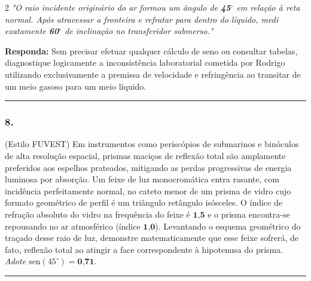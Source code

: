 \documentclass[twoside, 10pt, a4paper]{article}
\newlength{\espacoPreQuestao}\setlength{\espacoPreQuestao}{0.1cm}
\newlength{\espacoQuestao}\setlength{\espacoQuestao}{0.2cm}
\begin{document}
\begin{multicols*}{2}
\textit{"O raio incidente originário do ar formou um ângulo de \textbf{45}$^\circ$ em relação à reta normal. Após atravessar a fronteira e refratar para dentro do líquido, medi exatamente \textbf{60}$^\circ$ de inclinação no transferidor submerso."}
\begin{boxresponda}
\textbf{Responda:} Sem precisar efetuar qualquer cálculo de seno ou consultar tabelas, diagnostique logicamente a inconsistência laboratorial cometida por Rodrigo utilizando exclusivamente a premissa de velocidade e refringência ao transitar de um meio gasoso para um meio líquido.
\end{boxresponda}
\par\vspace{\espacoQuestao}

\noindent\textcolor{CorLinha}{\rule{\linewidth}{0.5pt}} 
\par\vspace{\espacoPreQuestao}
\subsubsection*{8.} (Estilo FUVEST) Em instrumentos como periscópios de submarinos e binóculos de alta resolução espacial, prismas maciços de reflexão total são amplamente preferidos aos espelhos prateados, mitigando as perdas progressivas de energia luminosa por absorção. Um feixe de luz monocromática entra rasante, com incidência perfeitamente normal, no cateto menor de um prisma de vidro cujo formato geométrico de perfil é um triângulo retângulo isósceles. O índice de refração absoluto do vidro na frequência do feixe é $ \textbf{1,5} $ e o prisma encontra-se repousando no ar atmosférico (índice $ \textbf{1,0} $).
Levantando o esquema geométrico do traçado desse raio de luz, demonstre matematicamente que esse feixe sofrerá, de fato, reflexão total ao atingir a face correspondente à hipotenusa do prisma. \textit{Adote $ \text{sen}(45^\circ) = \textbf{0,71} $}.
\par\vspace{\espacoQuestao}

\noindent\textcolor{CorLinha}{\rule{\linewidth}{0.5pt}} 
\par\vspace{\espacoPreQuestao}

\end{multicols*}
\end{document}
